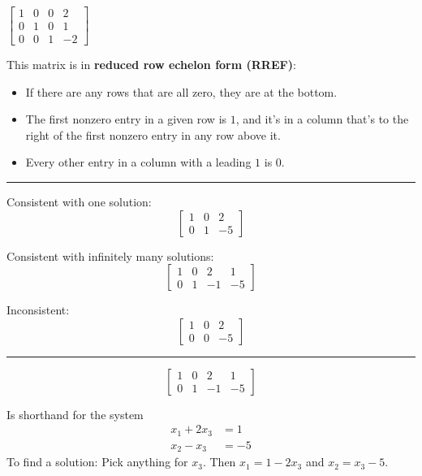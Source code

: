 \documentclass[
  letterpaper,
  DIV=11,
  numbers=noendperiod]{scrartcl}
\providecommand{\tightlist}{%
  \setlength{\itemsep}{0pt}\setlength{\parskip}{0pt}}\usepackage{longtable,booktabs,array}
\begin{document}
$\displaystyle \left[\begin{matrix}1 & 0 & 0 & 2\\0 & 1 & 0 & 1\\0 & 0 & 1 & -2\end{matrix}\right]$

This matrix is in \textbf{reduced row echelon form (RREF)}:

\begin{itemize}
\tightlist
\item
  If there are any rows that are all zero, they are at the bottom.
\item
  The first nonzero entry in a given row is \(1\), and it's in a column
  that's to the right of the first nonzero entry in any row above it.
\item
  Every other entry in a column with a leading \(1\) is \(0\).
\end{itemize}

\begin{center}\rule{0.5\linewidth}{0.5pt}\end{center}

Consistent with one solution: \[\begin{bmatrix}
1 & 0 & 2 \\
0 & 1 & -5 
\end{bmatrix}\]

Consistent with infinitely many solutions: \[\begin{bmatrix}
1 & 0 & 2 & 1 \\
0 & 1 & -1 & -5  
\end{bmatrix}\]

Inconsistent: \[\begin{bmatrix}
1 & 0 & 2 \\
0 & 0 & -5 
\end{bmatrix}\]

\begin{center}\rule{0.5\linewidth}{0.5pt}\end{center}

\[\begin{bmatrix}
1 & 0 & 2 & 1 \\
0 & 1 & -1 & -5  
\end{bmatrix}\]

Is shorthand for the system \[\begin{align*}
x_1 + 2x_3 &= 1 \\  
x_2 - x_3 &= -5
\end{align*}\] To find a solution: Pick anything for \(x_3\). Then
\(x_1 = 1 - 2x_3\) and \(x_2 = x_3 - 5\).
\end{document}
